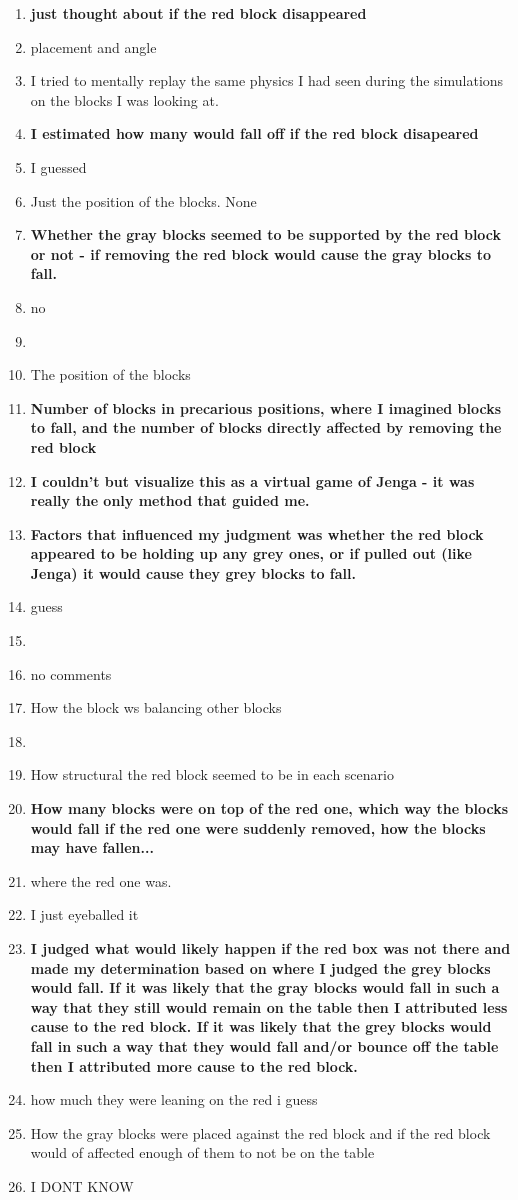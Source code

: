 \documentclass[11pt]{article}
\begin{document}
\begin{enumerate}
\item \textbf{just thought about if the red block disappeared} 
\item placement and angle
\item  I tried to mentally replay the same physics I had seen during the simulations on the blocks I was looking at.
\item \textbf{I estimated how many would fall off if the red block disapeared}
\item I guessed
\item Just the position of the blocks. None
\item \textbf{Whether the gray blocks seemed to be supported by the red block or not - if removing the red block would cause the gray blocks to fall.}
\item no
\item 
\item The position of the blocks
\item \textbf{Number of blocks in precarious positions, where I imagined blocks to fall, and the number of blocks directly affected by removing the red block}
\item \textbf{I couldn't but visualize this as a virtual game of Jenga - it was really the only method that guided me. }
\item \textbf{Factors that influenced my judgment was whether the red block appeared to be holding up any grey ones, or if pulled out (like Jenga) it would cause they grey blocks to fall.}
\item guess
\item 
\item no comments
\item How the block ws balancing other blocks
\item 
\item How structural the red block seemed to be in each scenario
\item \textbf{How many blocks were on top of the red one, which way the blocks would fall if the red one were suddenly removed, how the blocks may have fallen...}
\item where the red one was.
\item I just eyeballed it
\item \textbf{I judged what would likely happen if the red box was not there and made my determination based on where I judged the grey blocks would fall. If it was likely that the gray blocks would fall in such a way that they still would remain on the table then I attributed less cause to the red block. If it was likely that the grey blocks would fall in such a way that they would fall and/or bounce off the table then I attributed more cause to the red block.}
\item how much they were leaning on the red i guess
\item How the gray blocks were placed against the red block and if the red block would of affected enough of them to not be on the table
\item I DONT KNOW
\end{enumerate}
\end{document}
